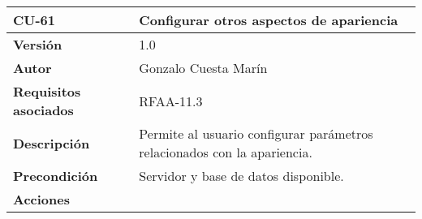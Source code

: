 \begin{longtable}[]{@{}ll@{}}
\toprule
\begin{minipage}[b]{0.22\columnwidth}\raggedright
\textbf{CU-61}\strut
\end{minipage} & \begin{minipage}[b]{0.72\columnwidth}\raggedright
\textbf{Configurar otros aspectos de apariencia}\strut
\end{minipage}\tabularnewline
\midrule
\endhead
\begin{minipage}[t]{0.22\columnwidth}\raggedright
\textbf{Versión}\strut
\end{minipage} & \begin{minipage}[t]{0.72\columnwidth}\raggedright
1.0\strut
\end{minipage}\tabularnewline
\begin{minipage}[t]{0.22\columnwidth}\raggedright
\textbf{Autor}\strut
\end{minipage} & \begin{minipage}[t]{0.72\columnwidth}\raggedright
Gonzalo Cuesta Marín\strut
\end{minipage}\tabularnewline
\begin{minipage}[t]{0.22\columnwidth}\raggedright
\textbf{Requisitos asociados}\strut
\end{minipage} & \begin{minipage}[t]{0.72\columnwidth}\raggedright
RFAA-11.3\strut
\end{minipage}\tabularnewline
\begin{minipage}[t]{0.22\columnwidth}\raggedright
\textbf{Descripción}\strut
\end{minipage} & \begin{minipage}[t]{0.72\columnwidth}\raggedright
Permite al usuario configurar parámetros relacionados con la
apariencia.\strut
\end{minipage}\tabularnewline
\begin{minipage}[t]{0.22\columnwidth}\raggedright
\textbf{Precondición}\strut
\end{minipage} & \begin{minipage}[t]{0.72\columnwidth}\raggedright
Servidor y base de datos disponible.\strut
\end{minipage}\tabularnewline
\begin{minipage}[t]{0.22\columnwidth}\raggedright
\textbf{Acciones}\strut
\end{minipage} & \begin{minipage}[t]{0.72\columnwidth}\raggedright
\begin{enumerate}

\end{enumerate}
\end{minipage}
\end{longtable}

